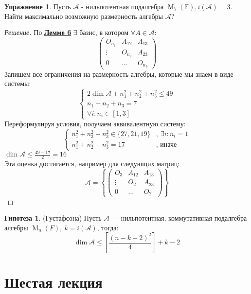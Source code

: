 \documentclass[a4paper, 14pt]{extarticle}
\theoremstyle{definition}
\newtheorem{exec}{Упражнение}
\newtheorem{hypot}{Гипотеза}
\begin{document}
\begin{exec}
	Пусть \(\mathcal{A}\) - нильпотентная подалгебра \(\operatorname{M}_7(\mathbb{F}), i(\mathcal{A}) = 3\). Найти максимально возможную размерность алгебры \(\mathcal{A}\)?
\end{exec}

\begin{proof}[Решение]
	По \hyperref[lm5_1]{\textbf{Лемме 6}} \(\exists\) базис, в котором \(\forall A \in \mathcal{A}:\)
	\[\left(
		\begin{array}{ccc}
			O_{n_1} & A_{12} & A_{13} \\
			\vdots & O_{n_2} & A_{23} \\
			0 & \hdots & O_{n_3}
		\end{array}
	\right)\]
	Запишем все ограничения на размерность алгебры, которые мы знаем в виде системы:
	\[\begin{cases}
		2 \operatorname{dim}\mathcal{A} + n_1^2 + n_2^2 + n_3^2 \leqslant 49 \\
		n_1 + n_2 + n_3 = 7 \\
		\forall i : n_i \in [1, 3]
	\end{cases}\]
	Переформулируя условия, получаем эквивалентную систему:
	\[\begin{cases}
		n_1^2 + n_2^2 + n_3^2 \in \{27, 21, 19\} & ,\ \exists i: n_i = 1 \\
		n_1^2 + n_2^2 + n_3^2 = 17 & \text{, иначе}
	\end{cases}\]
	\(\operatorname{dim}\mathcal{A} \leqslant \frac{49 - 17}{2} = 16\) \\
	Эта оценка достигается, например для следующих матриц:
	\[\mathcal{A} = \left\{\left(
		\begin{array}{c|c|c}
			O_3 & A_{12} & A_{13} \\
			\hline
			\vdots & O_2 & A_{23} \\
			\hline
			0 & \hdots & O_2
		\end{array}
	\right)\right\}\]
\end{proof}

\begin{hypot}\label{h5_1}
	(Густафсона) Пусть \(\mathcal{A}\) --- нильпотентная, коммутативная подалгебра алгебры \(\operatorname{M}_n(\mathbb{}F),\ k = i(\mathcal{A})\), тогда:
	\[\operatorname{dim} \mathcal{A} \leqslant \left[ \frac{(n - k + 2)^2}{4} \right] + k - 2\]
\end{hypot}

\newpage

\section{Шестая лекция}
\end{document}
